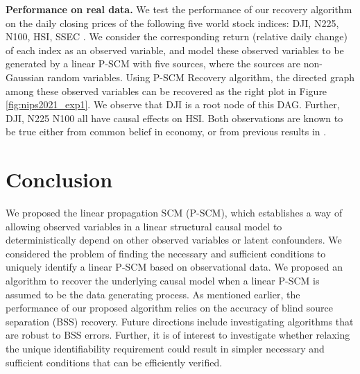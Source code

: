 \documentclass[12pt]{article}
\begin{document}

{\textbf{Performance on real data.}} 
We test the performance of our recovery algorithm on the daily closing prices of the following five world stock indices: DJI, N225, N100, HSI, SSEC \citep{hyvarinen2010estimation,salehkaleybar2020learning}.
We consider the corresponding return (relative daily change) of each index as an observed variable, and model these observed variables to be generated by a linear P-SCM with five sources, where the sources are non-Gaussian random variables. 
Using P-SCM Recovery algorithm, the directed graph among these observed variables can be recovered as the right plot in Figure \ref{fig:nips2021_exp1}. We observe that DJI is a root node of this DAG. Further, DJI, N225 N100 all have causal effects on HSI. Both observations are known to be true either from common belief in economy, or from previous results in \citep{hyvarinen2010estimation}.

\section{Conclusion} \label{sec:conclusion}
\vspace{-2mm}
We proposed the linear propagation SCM (P-SCM), which establishes a way of allowing observed variables in a linear structural causal model to deterministically depend on other observed variables or latent confounders. We considered the problem of finding the necessary and sufficient conditions to uniquely identify a linear P-SCM based on observational data. We proposed an algorithm to recover the underlying causal model when a linear P-SCM is assumed to be the data generating process. As mentioned earlier, the performance of our proposed algorithm relies on the accuracy of blind source separation (BSS) recovery. Future directions include investigating algorithms that are robust to BSS errors. Further, it is of interest to investigate whether relaxing the unique identifiability requirement could result in simpler necessary and sufficient conditions that can be efficiently verified.
\end{document}
